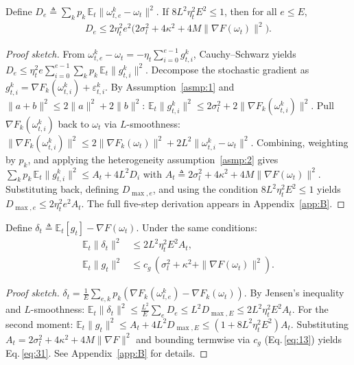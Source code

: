 \begin{lemma}\label{lem:1}
  Define \(D_e \triangleq \sum_k p_k\,\mathbb E_t\|\omega_{t,e}^k - \omega_t\|^2\).
  If \(8L^2\eta_t^2 E^2 \le 1\), then for all \(e \le E\),
  \begin{align}
    D_e \le 2\eta_t^2 e^2\bigl(2\sigma_l^2 + 4\kappa^2 + 4M\|\nabla F(\omega_t)\|^2\bigr).
    \label{eq:26}
  \end{align}
\end{lemma}

\begin{proof}[Proof sketch]
  From \(\omega_{t,e}^k - \omega_t = -\eta_t\sum_{i=0}^{e-1}g_{t,i}^k\), Cauchy--Schwarz yields
  \(D_e \le \eta_t^2 e\sum_{i=0}^{e-1}\sum_k p_k\,\mathbb E_t\|g_{t,i}^k\|^2\).
  Decompose the stochastic gradient as \(g_{t,i}^k = \nabla F_k(\omega_{t,i}^k) + \varepsilon_{t,i}^k\).
  By Assumption~\ref{asmp:1} and \(\|a+b\|^2 \le 2\|a\|^2 + 2\|b\|^2\):
  \(\mathbb E_t\|g_{t,i}^k\|^2 \le 2\sigma_l^2 + 2\|\nabla F_k(\omega_{t,i}^k)\|^2\).
  Pull \(\nabla F_k(\omega_{t,i}^k)\) back to \(\omega_t\) via \(L\)-smoothness:
  \(\|\nabla F_k(\omega_{t,i}^k)\|^2 \le 2\|\nabla F_k(\omega_t)\|^2 + 2L^2\|\omega_{t,i}^k - \omega_t\|^2\).
  Combining, weighting by \(p_k\), and applying the heterogeneity assumption~\ref{asmp:2} gives
  \(\sum_k p_k\,\mathbb E_t\|g_{t,i}^k\|^2 \le A_t + 4L^2 D_i\) with
  \(A_t \triangleq 2\sigma_l^2 + 4\kappa^2 + 4M\|\nabla F(\omega_t)\|^2\).
  Substituting back, defining \(D_{\max,e}\), and using the condition \(8L^2\eta_t^2E^2\le 1\) yields
  \(D_{\max,e} \le 2\eta_t^2 e^2 A_t\).
  The full five-step derivation appears in Appendix~\ref{app:B}.
\end{proof}

\begin{lemma}\label{lem:2}
  Define \(\delta_t \triangleq \mathbb E_t[g_t] - \nabla F(\omega_t)\). Under the same conditions:
  \begin{align}
    \mathbb E_t\|\delta_t\|^2 &\le 2L^2\eta_t^2 E^2 A_t, \label{eq:30}\\
    \mathbb E_t\|g_t\|^2 &\le c_g\,(\sigma_l^2 + \kappa^2 + \|\nabla F(\omega_t)\|^2). \label{eq:31}
  \end{align}
\end{lemma}

\begin{proof}[Proof sketch]
  \(\delta_t = \frac{1}{E}\sum_{e,k} p_k(\nabla F_k(\omega_{t,e}^k) - \nabla F_k(\omega_t))\).
  By Jensen's inequality and \(L\)-smoothness:
  \(\mathbb E_t\|\delta_t\|^2 \le \frac{L^2}{E}\sum_e D_e \le L^2 D_{\max,E} \le 2L^2\eta_t^2 E^2 A_t\).
  For the second moment:
  \(\mathbb E_t\|g_t\|^2 \le A_t + 4L^2 D_{\max,E} \le (1+8L^2\eta_t^2 E^2)A_t\).
  Substituting \(A_t = 2\sigma_l^2 + 4\kappa^2 + 4M\|\nabla F\|^2\) and bounding termwise via \(c_g\) (Eq.\,\eqref{eq:13}) yields Eq.\,\eqref{eq:31}.
  See Appendix~\ref{app:B} for details.
\end{proof}

